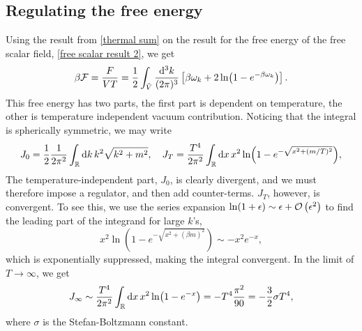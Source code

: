 \subsection{Regulating the free energy}
Using the result from \autoref{thermal sum} on the result for the free energy of the free scalar field, \autoref{free scalar result 2}, we get
\begin{equation}
    \label{free scalar free enrgy}
    \beta \mathcal{F} = \frac{F}{VT}
    = \frac{1}{2} \int_{\tilde V} \frac{\dd^3 k}{(2 \pi)^3}
    \left[
        \beta \omega_k + 2\ln(1 - e^{-\beta\omega_k})
    \right].
\end{equation}
This free energy has two parts, the first part is dependent on temperature, the other is temperature independent vacuum contribution.
Noticing that the integral is spherically symmetric, we may write
\begin{equation}
    J_0 = \frac{1}{2} \frac{1}{2 \pi^2}\int_{\mathbb{R}} \dd k \, k^2 \sqrt{k^2 + m^2}, \quad
    J_T = \frac{T^4}{2 \pi^2}\int_{\mathbb{R}} \dd x \, x^2  \ln(1 - e^{-\sqrt{x^2 + (m/T)^2}}), 
\end{equation}
The temperature-independent part, $J_0$, is clearly divergent, and we must therefore impose a regulator, and then add counter-terms.
$J_T$, however, is convergent. 
To see this, we use the series expansion $\ln(1 + \epsilon) \sim \epsilon + \mathcal{O}\left(\epsilon^{2}\right)$ to find the leading part of the integrand for large $k$'s, 
\begin{equation}
    x^2 \ln(1 - e^{-\sqrt{x^2 + (\beta m)^2}}) \sim - x^2 e^{-x}, 
\end{equation}
which is exponentially suppressed, making the integral convergent.
In the limit of $T \rightarrow \infty$, we get
\begin{equation}
    J_\infty \sim \frac{T^4}{2 \pi^2} \int_{\mathbb{R}} \dd x \, x^2 \ln(1 - e^{-x})
    = - T^4 \frac{\pi^2}{90} = -\frac{3}{2} \sigma T^4,
\end{equation}
where $\sigma$ is the Stefan-Boltzmann constant. 

